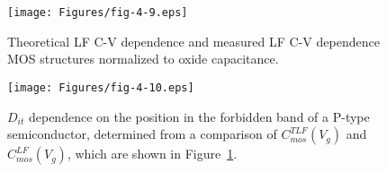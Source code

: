\begin{figure}[h!]\centering
  \texttt{[image: Figures/fig-4-9.eps]}
  \caption[Theoretical LF C-V dependence and measured LF C-V
    dependence]{Theoretical LF C-V dependence and measured LF C-V
    dependence MOS structures normalized to oxide
    capacitance.}\label{fig:4.9}
\end{figure}

\begin{figure}[h!]\centering
  \texttt{[image: Figures/fig-4-10.eps]}
  \caption[Dependence of $D_{it}$ on the position in the forbidden
    band of the semiconductor determined from the comparison of
    $C_{mos}^{TLF}(V_{g})$ and $C_{mos}^{LF}(V_{g})$]{$D_{it}$
    dependence on the position in the forbidden band of a P-type
    semiconductor, determined from a comparison of
    $C_{mos}^{TLF}(V_{g})$ and $C_{mos}^{LF}(V_{g})$, which are shown
    in Figure~\ref{fig:4.9}.}\label{fig:4.10}
\end{figure}


